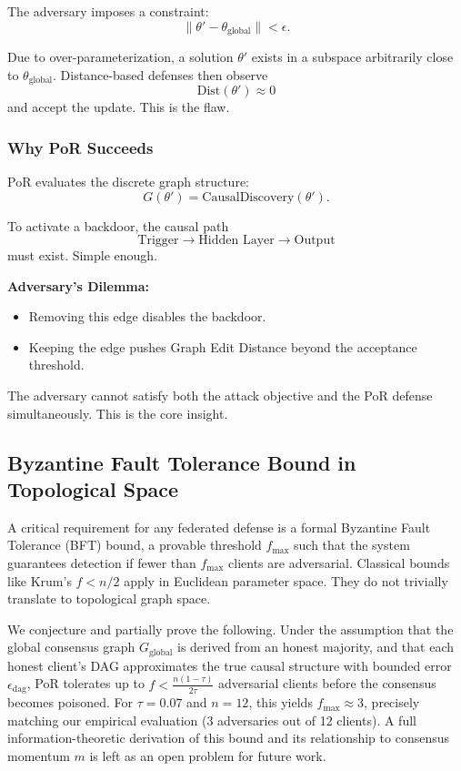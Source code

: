 \documentclass[journal]{IEEEtran}
\begin{document}
The adversary imposes a constraint:
\[
\lVert \theta' - \theta_{\text{global}} \rVert < \epsilon. \]

Due to over-parameterization, a solution $\theta'$ exists in a subspace arbitrarily close to $\theta_{\text{global}}$. Distance-based defenses then observe
\[
\text{Dist}(\theta') \approx 0
\]
and accept the update. This is the flaw.

\subsubsection{Why PoR Succeeds}

PoR evaluates the discrete graph structure:
\[
G(\theta') = \text{CausalDiscovery}(\theta'). \]

To activate a backdoor, the causal path
\[
\text{Trigger} \rightarrow \text{Hidden Layer} \rightarrow \text{Output}
\]
must exist. Simple enough.

\textbf{Adversary's Dilemma:}
\begin{itemize}
 \item Removing this edge disables the backdoor.
 \item Keeping the edge pushes Graph Edit Distance beyond the acceptance threshold.
\end{itemize}

The adversary cannot satisfy both the attack objective and the PoR defense simultaneously. This is the core insight.

\subsection{Byzantine Fault Tolerance Bound in Topological Space}

A critical requirement for any federated defense is a formal Byzantine Fault Tolerance (BFT) bound, a provable threshold $f_{\max}$ such that the system guarantees detection if fewer than $f_{\max}$ clients are adversarial. Classical bounds like Krum's $f < n/2$ apply in Euclidean parameter space. They do not trivially translate to topological graph space.

We conjecture and partially prove the following. Under the assumption that the global consensus graph $G_{\text{global}}$ is derived from an honest majority, and that each honest client's DAG approximates the true causal structure with bounded error $\epsilon_{\text{dag}}$, PoR tolerates up to $f < \frac{n(1 - \tau)}{2\tau}$ adversarial clients before the consensus becomes poisoned. For $\tau=0.07$ and $n=12$, this yields $f_{\max} \approx 3$, precisely matching our empirical evaluation (3 adversaries out of 12 clients). A full information-theoretic derivation of this bound and its relationship to consensus momentum $m$ is left as an open problem for future work.
\end{document}
